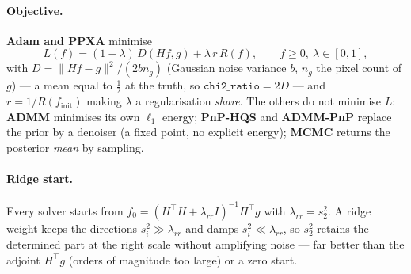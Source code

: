 \paragraph{Objective.}
\textbf{Adam and PPXA} minimise
\begin{equation}
  L(f) = (1-\lambda)\, D(Hf,g) + \lambda\,r\,R(f), \qquad f \ge 0,\ \lambda \in [0,1],
  \label{eq:objective}
\end{equation}
with $D = \lVert Hf-g\rVert^2/(2 b n_g)$ (Gaussian noise variance $b$, $n_g$ the pixel count of
$g$) --- a mean equal to $\tfrac12$ at the truth, so $\texttt{chi2\_ratio}=2D$ --- and
$r = 1/R(f_{\text{init}})$ making $\lambda$ a regularisation \emph{share}. The others do not
minimise $L$: \textbf{ADMM} minimises its own $\ell_1$ energy; \textbf{PnP-HQS} and
\textbf{ADMM-PnP} replace the prior by a denoiser (a fixed point, no explicit energy);
\textbf{MCMC} returns the posterior \emph{mean} by sampling.

\paragraph{Ridge start.}
Every solver starts from $f_0 = (H^{\!\top}\!H + \lambda_{rr} I)^{-1} H^{\!\top} g$ with
$\lambda_{rr} = s_2^2$. A ridge weight keeps the directions $s_i^2 \gg \lambda_{rr}$ and damps
$s_i^2 \ll \lambda_{rr}$, so $s_2^2$ retains the determined part at the right scale without
amplifying noise --- far better than the adjoint $H^{\!\top} g$ (orders of magnitude too large) or
a zero start.

